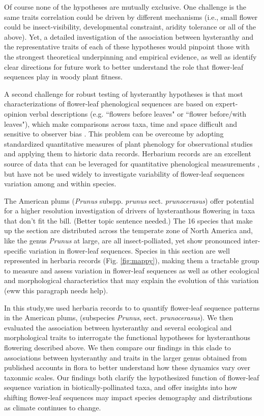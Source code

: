 \documentclass{article}[11pt]
\begin{document}
Of course none of the hypotheses are mutually exclusive. One challenge is the same traits correlation could be driven by different mechanisms (i.e., small flower could be insect-visibility, developmental constraint, aridity tolerance or all of the above). Yet, a detailed investigation of the association between hysteranthy and the representative traits of each of these hypotheses would pinpoint those with the strongest theoretical underpinning and empirical evidence, as well as identify clear directions for future work to better understand the role that flower-leaf sequences play in woody plant fitness.

\noindent A second challenge for robust testing of hysteranthy hypotheses is that most characterizations of flower-leaf phenological sequences are based on expert-opinion verbal descriptions (e.g. ``flowers before leaves" or ``flower before/with leaves"), which make comparisons across taxa, time and space difficult and sensitive to observer bias  \citep[see;][]{Buonaiuto2020}. This problem can be overcome by adopting standardized quantitative measures of plant phenology for observational studies and applying them to historic data records. Herbarium records are an excellent source of data that can be leveraged for quantitative phenological measurements \citep{Willis2017}, but have not be used widely to investigate variability of flower-leaf sequences variation among and within species.

The American plums (\textit{Prunus} subspp. \textit{prunus} sect. \textit{prunocerasus}) offer potential for a higher resolution investigation of drivers of hysteranthous flowering in taxa that don't fit the bill. (Better topic sentence needed.) The 16 species that make up the section are distributed across the temperate zone of North America and, like the genus \textit{Prunus} at large, are all insect-polliated, yet show pronounced inter-specific variation in flower-leaf sequences.  Species in this section are well represented in herbaria records (Fig. \ref{fig:mappy}), making them a tractable group to measure and assess variation in flower-leaf sequences as well as other ecological and morphological characteristics that may explain the evolution of this variation (eww this paragraph needs help). 

\noindent In this study,we used herbaria records to to quantify flower-leaf sequence patterns in the American plums, (subspecies  \textit{Prunus}, sect. \textit{prunocerasus}). We then evaluated the association between hysteranthy and several ecological and morphological traits to interrogate the functional hypotheses for hysteranthous flowering described above. We then compare our findings in this clade to associations between hysteranthy and traits in the larger genus obtained from published accounts in flora to better understand how these dynamics vary over taxonmic scales. Our findings both clarify the hypothesized function of flower-leaf sequence variation in biotically-pollinated taxa, and offer insights into how shifting flower-leaf sequences may impact species demography and distributions as climate continues to change.
\end{document}
